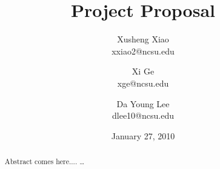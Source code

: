 \documentclass[times, 10pt,onecolumn]{article}
\title{Project Proposal}
\author{
Xusheng Xiao\\
\small{xxiao2@ncsu.edu}\\
\and
Xi Ge\\
\small{xge@ncsu.edu}\\
\and
Da Young Lee\\
\small{dlee10@ncsu.edu}
}
\date{January 27, 2010}
\begin{document}
\maketitle
\thispagestyle{empty}
\pagestyle{empty}

\begin{abstract}
Abstract comes here....
\ldots
\end{abstract}









\end{document}
